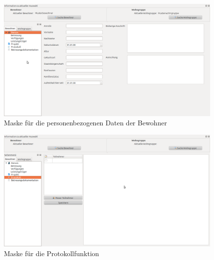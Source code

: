 \documentclass[a4paper,10pt]{article}
\begin{document}
\begin{figure}
\includegraphics[angle=90, width=\textwidth, height=\textheight]{BewohnerInfo}
\caption{Maske für die personenbezogenen Daten der Bewohner}
\label{Info}
\end{figure}
\begin{figure}
 \includegraphics[angle=90, width=\textwidth, height=\textheight]{BewohnerProtokoll}
\caption{Maske für die Protokollfunktion}
\label{Protokoll}
\end{figure}
\end{document}
